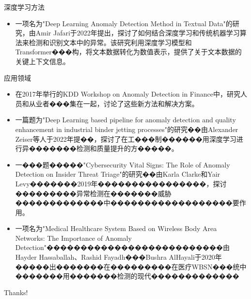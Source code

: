 \documentclass[UTF8,AutoFakeBold,AutoFakeSlant]{beamer}
\begin{document}
\begin{frame}{深度学习方法}
    \begin{itemize}
        \item 一项名为"Deep Learning Anomaly Detection Method in Textual Data"的研究，由Amir Jafari于2022年提出，探讨了如何结合深度学习和传统机器学习算法来检测和识别文本中的异常。该研究利用深度学习模型和Transformer���构，将文本数据转化为数值表示，提供了关于文本数据的关键上下文信息。
    \end{itemize}
\end{frame}

\begin{frame}{应用领域}
    \scriptsize
    \begin{itemize}
        \item 在2017年举行的KDD Workshop on Anomaly Detection in Finance中，研究人员和从业者���集在一起，讨论了这些新方法和解决方案。
        \item 一篇题为"Deep Learning based pipeline for anomaly detection and quality enhancement in industrial binder jetting processes"的研究��由Alexander Zeiser等人于2022年提��，探讨了在工���制������用深度学习进行异�������检测和质量提升的方�����。
        \item 一���题�����"Cybersecurity Vital Signs: The Role of Anomaly Detection on Insider Threat Triage"的研究��由Karla Clarke和Yair Levy�������2019年����������������，探讨���������异常检测在�������威胁�������������中������������������要作用。
        \item 一项名为"Medical Healthcare System Based on Wireless Body Area Networks: The Importance of Anomaly Detection"��������������������������由Hayder Hassaballah、Rashid Fayadh���Bushra AlHayali于2020年�����出�������在���������在医疗WBSN���统中�������用�������检测的现代�������������
    \end{itemize}
\end{frame}

\begin{frame}
    \begin{center}
        {\Huge\calligra Thanks!}
    \end{center}
\end{frame}
\end{document}
